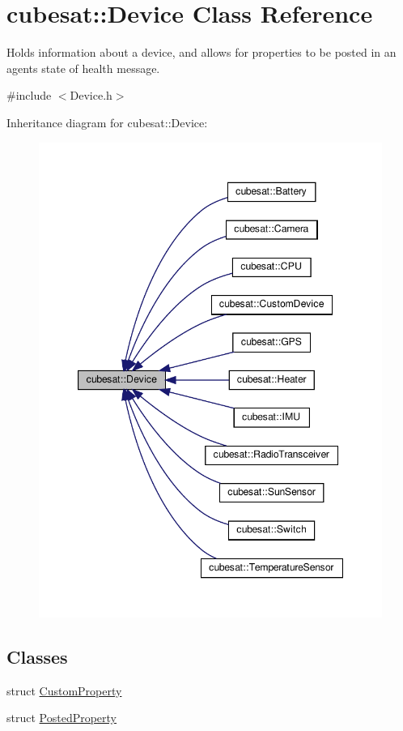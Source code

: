 \hypertarget{classcubesat_1_1Device}{}\section{cubesat\+:\+:Device Class Reference}
\label{classcubesat_1_1Device}


Holds information about a device, and allows for properties to be posted in an agent\textquotesingle{}s state of health message.  




{\ttfamily \#include $<$Device.\+h$>$}



Inheritance diagram for cubesat\+:\+:Device\+:
\nopagebreak
\begin{figure}[H]
\begin{center}
\leavevmode
\includegraphics[width=347pt]{classcubesat_1_1Device__inherit__graph}
\end{center}
\end{figure}
\subsection*{Classes}
\begin{DoxyCompactItemize}
\item 
struct \hyperlink{structcubesat_1_1Device_1_1CustomProperty}{Custom\+Property}
\item 
struct \hyperlink{structcubesat_1_1Device_1_1PostedProperty}{Posted\+Property}
\end{DoxyCompactItemize}
